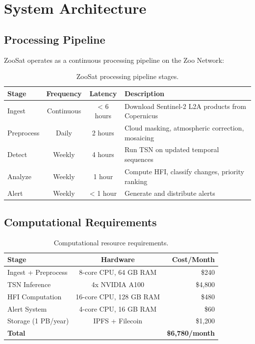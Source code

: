 \documentclass[11pt,a4paper]{article}
\begin{document}
\section{System Architecture}
\label{sec:architecture}

\subsection{Processing Pipeline}

ZooSat operates as a continuous processing pipeline on the Zoo Network:

\begin{table}[H]
\centering
\caption{ZooSat processing pipeline stages.}
\label{tab:pipeline}
\begin{tabularx}{\textwidth}{@{}lccX@{}}
\toprule
\textbf{Stage} & \textbf{Frequency} & \textbf{Latency} & \textbf{Description} \\
\midrule
Ingest & Continuous & < 6 hours & Download Sentinel-2 L2A products from Copernicus \\
Preprocess & Daily & 2 hours & Cloud masking, atmospheric correction, mosaicing \\
Detect & Weekly & 4 hours & Run TSN on updated temporal sequences \\
Analyze & Weekly & 1 hour & Compute HFI, classify changes, priority ranking \\
Alert & Weekly & < 1 hour & Generate and distribute alerts \\
\bottomrule
\end{tabularx}
\end{table}

\subsection{Computational Requirements}

\begin{table}[H]
\centering
\caption{Computational resource requirements.}
\label{tab:compute}
\begin{tabular}{@{}lcr@{}}
\toprule
\textbf{Stage} & \textbf{Hardware} & \textbf{Cost/Month} \\
\midrule
Ingest + Preprocess & 8-core CPU, 64 GB RAM & \$240 \\
TSN Inference & 4x NVIDIA A100 & \$4,800 \\
HFI Computation & 16-core CPU, 128 GB RAM & \$480 \\
Alert System & 4-core CPU, 16 GB RAM & \$60 \\
Storage (1 PB/year) & IPFS + Filecoin & \$1,200 \\
\midrule
\textbf{Total} & & \textbf{\$6,780/month} \\
\bottomrule
\end{tabular}
\end{table}
\end{document}
